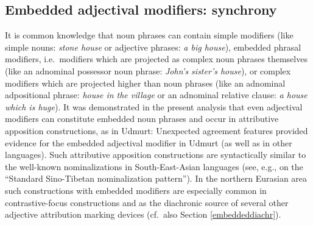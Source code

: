 \subsection{Embedded adjectival modifiers: synchrony} \label{embeddedsynchr}
It is common knowledge that noun phrases can contain simple modifiers (like simple nouns: \textit{stone house} or adjective phrases: \textit{a big house}), embedded phrasal modifiers, i.e.~modifiers which are projected as complex noun phrases themselves (like an adnominal possessor noun phrase: \textit{John's sister's house}), or complex modifiers which are projected higher than noun phrases (like an adnominal adpositional phrase: \textit{house in the village} or an adnominal relative clause: \textit{a house which is huge}). It was demonstrated in the present analysis that even adjectival modifiers can constitute embedded noun phrases and occur in attributive apposition constructions, as in Udmurt:
Unexpected agreement features provided evidence for the embedded adjectival modifier in Udmurt (as well as in other languages). Such attributive apposition constructions are syntactically similar to the well-known nominalizations in South-East-Asian languages (see, e.g., \citealt{bickel1999} on the “Standard Sino-Tibetan nominalization pattern”). In the northern Eurasian area such constructions with embedded modifiers are especially  common in contrastive-focus constructions and as the diachronic source of several other adjective attribution marking devices (cf.~also Section \ref{embeddeddiachr}). 


